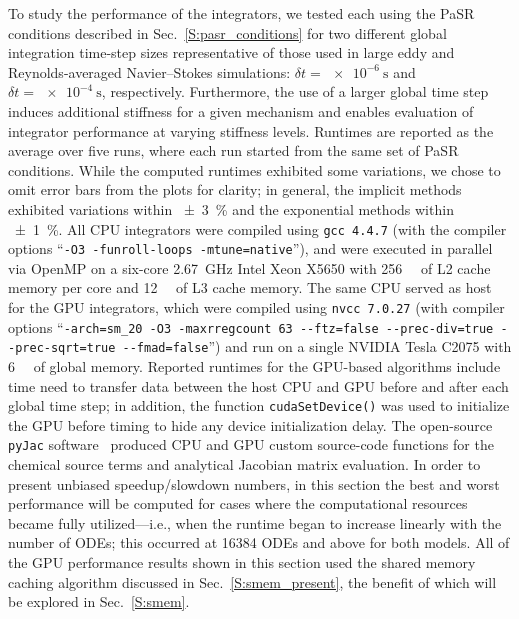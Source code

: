 \documentclass[preprint]{elsarticle}
\begin{document}
To study the performance of the integrators, we tested each using the PaSR conditions described in Sec.~\ref{S:pasr_conditions} for two different global integration time-step sizes representative of those used in large eddy and Reynolds-averaged Navier--Stokes simulations: $\delta t = \SI{e-6}{\s}$ and $\delta t = \SI{e-4}{\s}$, respectively.
Furthermore, the use of a larger global time step induces additional stiffness for a given mechanism and enables evaluation of integrator performance at varying stiffness levels.
Runtimes are reported as the average over five runs, where each run started from the same set of PaSR conditions.
While the computed runtimes exhibited some variations, we chose to omit error bars from the plots for clarity; in general, the implicit methods exhibited variations within \SI{\pm3}{\percent} and the exponential methods within \SI{\pm1}{\percent}.
All CPU integrators were compiled using \texttt{gcc 4.4.7} (with the compiler options ``\texttt{-O3 -funroll-loops -mtune=native}''), and were executed in parallel via OpenMP on a six-core \SI{2.67}{\giga\hertz} Intel Xeon X5650 with \SI{256}{\kilo\byte} of L2 cache memory per core and \SI{12}{\mega\byte} of L3 cache memory.
The same CPU served as host for the GPU integrators, which were compiled using \texttt{nvcc 7.0.27} (with compiler options ``\texttt{-arch=sm\_20 -O3 -maxrregcount 63 -{}-ftz=false -{}-prec-div=true -{}-prec-sqrt=true -{}-fmad=false}'') and run on a single NVIDIA Tesla C2075 with \SI{6}{\giga\byte} of global memory.
Reported runtimes for the GPU-based algorithms include time need to transfer data between the host CPU and GPU before and after each global time step; in addition, the function \texttt{cudaSetDevice()} was used to initialize the GPU before timing to hide any device initialization delay.
The open-source \texttt{pyJac} software~\cite{Niemeyer:2015im,Niemeyer:2015ws} produced CPU and GPU custom source-code functions for the chemical source terms and analytical Jacobian matrix evaluation.
In order to present unbiased speedup\slash slowdown numbers, in this section the best and worst performance will be computed for cases where the computational resources became fully utilized---i.e., when the runtime began to increase linearly with the number of ODEs; this occurred at \num{16384} ODEs and above for both models.
All of the GPU performance results shown in this section used the shared memory caching algorithm discussed in Sec.~\ref{S:smem_present}, the benefit of which will be explored in Sec.~\ref{S:smem}.
\end{document}
